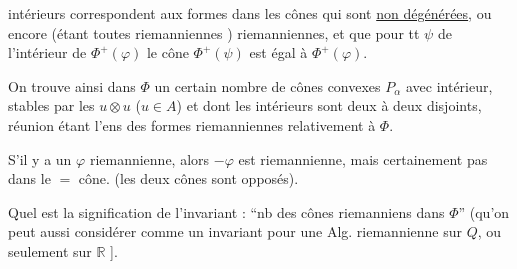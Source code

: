 intérieurs correspondent aux formes dans les
cônes qui sont \uline{non dégénérées}, ou encore
(étant toutes riemanniennes ) riemanniennes,
et que pour tt $\psi$ de l'intérieur de
$\Phi^+(\varphi)$ le cône $\Phi^+(\psi)$ est égal à $\Phi^+(\varphi)$.

On trouve ainsi dans $\Phi$ un certain
nombre de cônes convexes  $P_\alpha$ avec
intérieur, stables par les $u\otimes u$ ($u\in A$)
et dont les intérieurs sont deux à
deux disjoints,   réunion  étant l'ens
des formes riemanniennes relativement à $\Phi$.

S'il y a un $\varphi$ riemannienne, alors $-\varphi$ est
riemannienne, mais certainement pas dans le
$=$ cône. (les deux cônes sont opposés).

Quel est la signification de l'invariant :
``nb des cônes riemanniens dans $\Phi$''
(qu'on peut aussi considérer comme
un invariant pour une Alg. riemannienne
sur $Q$, ou seulement sur $\mathbb R$ \unsure{---|-,-}].
